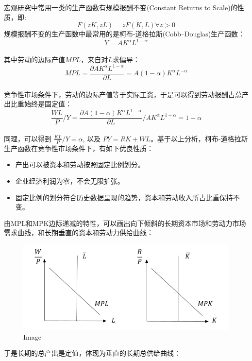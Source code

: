 \documentclass[
  11pt,
  letterpaper,
]{ctexbook}
\providecommand{\tightlist}{%
  \setlength{\itemsep}{0pt}\setlength{\parskip}{0pt}}\usepackage{longtable,booktabs,array}
\begin{document}
宏观研究中常用一类的生产函数有规模报酬不变(Constant Returns to
Scale)的性质，即:\\
\[
F(zK,zL) = zF(K,L) \forall z>0
\]
规模报酬不变的生产函数中最常用的是柯布-道格拉斯(Cobb--Douglas)生产函数：
\[
Y = AK^{\alpha}L^{1-\alpha}
\]\\
其中劳动的边际产值\(MPL\)，来自对\(L\)求偏导：\\
\[
MPL = \frac{\partial AK^{\alpha}L^{1-\alpha}}{\partial L} = A(1-\alpha)K^{\alpha}L^{-\alpha}
\]\\
竞争性市场条件下，劳动的边际产值等于实际工资，于是可以得到劳动报酬占总产出比重始终是固定值：
\[
\frac{WL}{P}/Y=\frac{\partial A(1-\alpha)K^{\alpha}L^{1-\alpha}}{\partial L} /AK^{\alpha}L^{1-\alpha} = 1-\alpha
\]\\
同理，可以得到 \(\frac{KL}{P}/Y=\alpha\), 以及
\(PY = RK + WL\)。基于以上分析，柯布-道格拉斯生产函数在竞争性市场条件下，有如下优良性质：

\begin{itemize}
\tightlist
\item
  产出可以被资本和劳动按照固定比例划分。
\item
  企业经济利润为零，不会无限扩张。
\item
  固定比例的划分符合历史数据呈现的趋势，资本和劳动收入所占比重保持不变。
\end{itemize}

由MPL和MPK边际递减的特性，可以画出向下倾斜的长期资本市场和劳动力市场需求曲线，和长期垂直的资本和劳动力供给曲线：

\begin{figure}[H]

{\centering \includegraphics{figures/1-1.png}

}

\caption{Image}

\end{figure}%

于是长期的总产出是定值，体现为垂直的长期总供给曲线：
\end{document}
